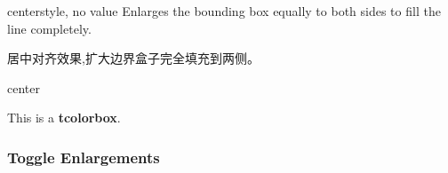 \begin{docTcbKey}[][doc new=2015-11-20]{center}{}{style, no value}
Enlarges the bounding box equally to both sides to fill the line completely.

居中对齐效果,扩大边界盒子完全填充到两侧。
\begin{exdispExample}{center}

\begin{tcolorbox}[center,width=5cm,enhanced,show bounding box]
This is a \textbf{tcolorbox}.
\end{tcolorbox}
\end{exdispExample}
\end{docTcbKey}





\subsubsection{Toggle Enlargements}

